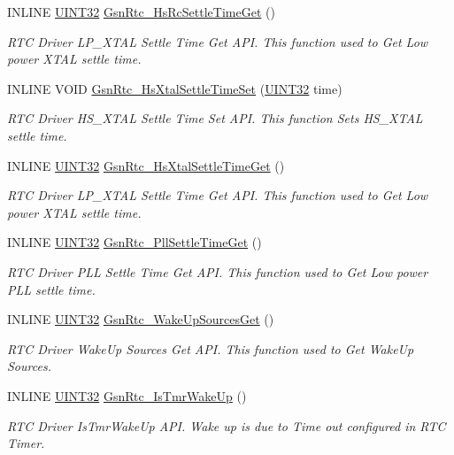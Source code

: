 \begin{DoxyCompactItemize}
INLINE \hyperlink{a00660_gae1e6edbbc26d6fbc71a90190d0266018}{UINT32} \hyperlink{a00651_gaf435dc6510168b10df7f98b5a9729ff3}{GsnRtc\_\-HsRcSettleTimeGet} ()
\begin{DoxyCompactList}\small\item\em RTC Driver LP\_\-XTAL Settle Time Get API. This function used to Get Low power XTAL settle time. \end{DoxyCompactList}\item 
INLINE VOID \hyperlink{a00651_ga6f74fe904609b816930c14d107ebf828}{GsnRtc\_\-HsXtalSettleTimeSet} (\hyperlink{a00660_gae1e6edbbc26d6fbc71a90190d0266018}{UINT32} time)
\begin{DoxyCompactList}\small\item\em RTC Driver HS\_\-XTAL Settle Time Set API. This function Sets HS\_\-XTAL settle time. \end{DoxyCompactList}\item 
INLINE \hyperlink{a00660_gae1e6edbbc26d6fbc71a90190d0266018}{UINT32} \hyperlink{a00651_gac8e4d362029658a699c14fa3ceec4802}{GsnRtc\_\-HsXtalSettleTimeGet} ()
\begin{DoxyCompactList}\small\item\em RTC Driver LP\_\-XTAL Settle Time Get API. This function used to Get Low power XTAL settle time. \end{DoxyCompactList}\item 
INLINE \hyperlink{a00660_gae1e6edbbc26d6fbc71a90190d0266018}{UINT32} \hyperlink{a00651_ga76272338daff01b78ecb5c4e92ff6bb8}{GsnRtc\_\-PllSettleTimeGet} ()
\begin{DoxyCompactList}\small\item\em RTC Driver PLL Settle Time Get API. This function used to Get Low power PLL settle time. \end{DoxyCompactList}\item 
INLINE \hyperlink{a00660_gae1e6edbbc26d6fbc71a90190d0266018}{UINT32} \hyperlink{a00651_ga46bf97151e65ad7c2eff132d8f158ac7}{GsnRtc\_\-WakeUpSourcesGet} ()
\begin{DoxyCompactList}\small\item\em RTC Driver WakeUp Sources Get API. This function used to Get WakeUp Sources. \end{DoxyCompactList}\item 
INLINE \hyperlink{a00660_gae1e6edbbc26d6fbc71a90190d0266018}{UINT32} \hyperlink{a00651_gac5f85e1752f44da34bca2d3166fa9216}{GsnRtc\_\-IsTmrWakeUp} ()
\begin{DoxyCompactList}\small\item\em RTC Driver IsTmrWakeUp API. Wake up is due to Time out configured in RTC Timer. \end{DoxyCompactList}\item 

\end{DoxyCompactItemize}
